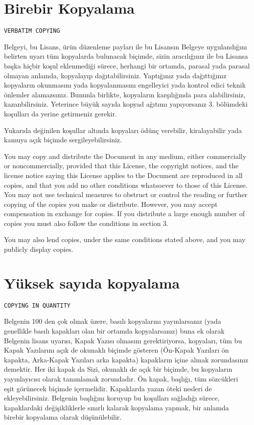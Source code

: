 \begin{multicols}{2}
\section{Birebir Kopyalama}\hfill\begin{verbatim}VERBATIM COPYING\end{verbatim}
\label{gfdl-2}
Belgeyi, bu Lisans, ürün düzenleme payları ile bu Lisansın Belgeye uygulandığını belirten uyarı tüm kopyalarda bulunacak biçimde, sizin aracılığınız ile bu Lisansa başka hiçbir koşul eklenmediği sürece, herhangi bir ortamda, parasal yada parasal olmayan anlamda, kopyalayıp dağıtabilirsiniz. Yaptığınız yada dağıttığınız kopyaların okunmasını yada  kopyalanmasını engelleyici yada kontrol edici teknik önlemler alamazsınız. Bununla birlikte, kopyaların karşılığında para alabilirsiniz, kazanbilirsiniz. Yeterince büyük sayıda kopyad ağıtımı yapıyorsanız 3. bölümdeki koşulları da yerine getirmeniz gerekir.
      
Yukarıda değinilen koşullar altında kopyaları ödünç verebilir, kiralayabilir yada kamuya açık biçimde sergileyebilirsiniz.

\begin{ingliz}
You may copy and distribute the Document in any medium,
either commercially or noncommercially, provided that this
License, the copyright notices, and the license notice saying
this License applies to the Document are reproduced in all
copies, and that you add no other conditions whatsoever to
those of this License.  You may not use technical measures to
obstruct or control the reading or further copying of the
copies you make or distribute.  However, you may accept
compensation in exchange for copies.  If you distribute a
large enough number of copies you must also follow the
conditions in section 3.
      
You may also lend copies, under the same conditions stated
above, and you may publicly display copies.
\end{ingliz}

\section{Yüksek sayıda kopyalama}\hfill\begin{verbatim}COPYING IN QUANTITY\end{verbatim}\label{gfdl-3}
Belgenin 100 den çok olmak üzere, basılı kopyalarını yayınlarsanız (yada genellikle basılı kapakları olan bir ortamda kopyalarsanız) buna ek olarak  Belgenin lisans uyarısı, Kapak Yazısı olmasını gerektiriyorsa, kopyaları, tüm bu Kapak Yazılarını açık de okunaklı biçimde gösteren (Ön-Kapak Yazıları ön kapakta, Arka-Kapak Yazıları arka kapakta) kapakların içine almak zorundasınız demektir. Her iki kapak da Sizi, okunaklı de açık bir biçimde, bu kopyaların yayınlayıcısı olarak tanımlamak zorundadır. Ön kapak, başlığı, tüm sözcükleri eşit görünecek biçimde içermelidir. Kapaklarda yazan öteki nesleri de ekleyebilirsiniz. Belgenin başlığını koruyup bu koşulları sağladığı sürece, kapaklardaki değişikliklerle sınırlı kalarak kopyalama yapmak, bir anlamda birebir kopyalama olarak düşünülebilir.


\end{multicols}
